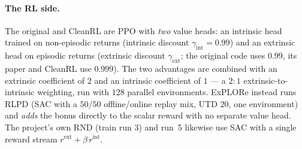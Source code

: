 \paragraph{The RL side.}
The original and CleanRL are PPO with \emph{two} value heads: an intrinsic head trained on
non-episodic returns (intrinsic discount $\gamma_{\mathrm{int}}{=}0.99$) and an extrinsic head on
episodic returns (extrinsic discount $\gamma_{\mathrm{ext}}$; the original code uses $0.99$, its
paper and CleanRL use $0.999$). The two advantages are combined with an extrinsic coefficient of
$2$ and an intrinsic coefficient of $1$ --- a $2\!:\!1$ extrinsic-to-intrinsic weighting, run with
$128$ parallel environments. ExPLORe instead runs RLPD (SAC with a $50/50$ offline/online replay
mix, UTD $20$, one environment) and \emph{adds} the bonus directly to the scalar reward with no
separate value head. The project's own RND (train run 3) and run~5 likewise use SAC with a single
reward stream $r^{\mathrm{ext}}+\beta\,r^{\mathrm{int}}$.

